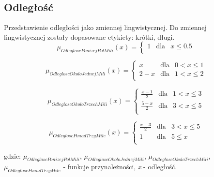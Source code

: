 \documentclass{classrep}
\begin{document}
\subsection{Odległość}

Przedstawienie odległości jako zmiennej lingwistycznej. Do zmiennej lingwistycznej zostały dopasowane etykiety: krótki, długi.
\begin{equation}
\mu _{OdlegloscPonizejPolMili}(x) = \left\{ \begin{array}{rcl}
1 & \mbox{dla} & x \leq 0.5 \\
\end{array}\right.
\end{equation}

\begin{equation}
\mu _{OdlegloscOkoloJednejMili}(x) = \left\{ \begin{array}{rcl}
x & \mbox{dla} & 0 < x \leq 1\\
2 - x & \mbox{dla} & 1 < x \leq 2\\
\end{array}\right.
\end{equation}

\begin{equation}
\mu _{OdlegloscOkoloTrzechMili}(x) = \left\{ \begin{array}{rcl}
\frac{x - 1}{2} & \mbox{dla} & 1 < x \leq 3\\
\frac{5 - x}{2} & \mbox{dla} & 3 < x \leq 5\\
\end{array}\right.
\end{equation}

\begin{equation}
\mu _{OdlegloscPonadTrzyMile}(x) = \left\{ \begin{array}{rcl}
\frac{x - 3}{2} & \mbox{dla} & 3 < x \leq 5\\
1 & \mbox{dla} & 5 \leq x \\
\end{array}\right.
\end{equation}

gdzie: \(\mu _{OdlegloscPonizejPolMili}\), \(\mu _{OdlegloscOkoloJednejMili}\), \(\mu _{OdlegloscOkoloTrzechMili}\), \(\mu _{OdlegloscPonadTrzyMile}\) - funkcje przynależności, \textit{x} - odległość.
\end{document}
